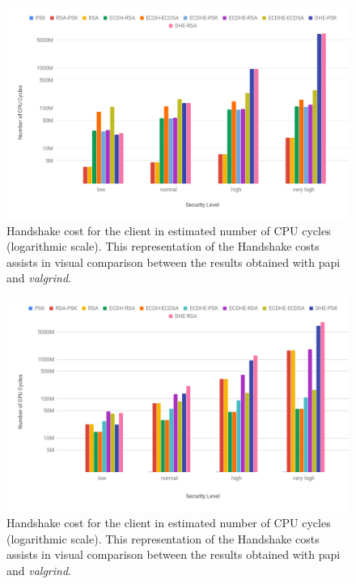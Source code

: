 				  \begin{figure}
					\centering
					\includegraphics[width=1.0\textwidth]{img/chart-20.png}
					\centering \caption{Handshake cost for the client in estimated number of CPU cycles (logarithmic scale). This representation 
					of the Handshake costs assists in visual comparison between the results obtained with \gls{papi} and \textit{valgrind}.}
					\label{fig:a-cli}
				  \end{figure}

				  \begin{figure}
					\centering
					\includegraphics[width=1.0\textwidth]{img/chart-21.png}
					\centering \caption{Handshake cost for the client in estimated number of CPU cycles (logarithmic scale). This representation 
					of the Handshake costs assists in visual comparison between the results obtained with \gls{papi} and \textit{valgrind}.}
					\label{fig:a-srv}
				  \end{figure}

